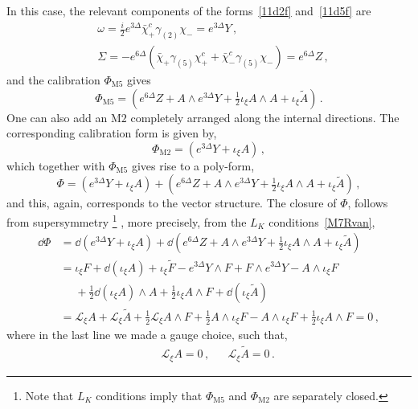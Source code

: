 \documentclass[debug]{phd}
\begin{document}
In this case, the relevant components of the forms~\eqref{11d2f} and~\eqref{11d5f} are 
%
	\begin{equation*}
		\begin{aligned}
			& \omega = \tfrac{i}{2} e^{3\Delta} \bar{\chi}_{+}^c \gamma_{(2)} \chi_{-} = e^{3\Delta} Y \, ,\\[1mm]
			& \Sigma = -e^{6\Delta}(\bar{\chi}_+ \gamma_{(5)} \chi_+^c + \bar{\chi}_-^c \gamma_{(5)} \chi_- ) = e^{6\Delta} Z\, ,
		\end{aligned}
	\end{equation*}
%
and the calibration $\Phi_{\mathrm{M}5}$ gives
%
	\begin{equation}
		\Phi_{\mathrm{M}5} = (e^{6\Delta} Z + A \wedge e^{3\Delta} Y + \tfrac{1}{2}\iota_\xi A \wedge A + \iota_{\xi}\tilde{A})\, .
	\end{equation}	
%
One can also add an $\mathrm{M}2$ completely arranged along the internal directions. 
The corresponding calibration form is given by,
%
	\begin{equation}
		\Phi_{\mathrm{M}2} = (e^{3\Delta} Y + \iota_{\xi} A )\, ,
	\end{equation}
%
which together with $\Phi_{\mathrm{M}5}$ gives rise to a poly-form,
%
	\begin{equation}
		\Phi = (e^{3\Delta} Y + \iota_{\xi} A ) + (e^{6\Delta} Z + A \wedge e^{3\Delta} Y + \tfrac{1}{2}\iota_\xi A \wedge A + \iota_{\xi}\tilde{A})\, ,
	\end{equation}
%
and this, again, corresponds to the vector structure. 
The closure of $\Phi$, follows from supersymmetry%
		\footnote{%
			Note that $L_K$ conditions imply that $\Phi_{\mathrm{M}5}$ and $\Phi_{\mathrm{M}2}$ are separately closed.%
			}%
			, more precisely, from the $L_K$ conditions~\eqref{M7Rvan},
%
		\begin{equation}
			\begin{split}
				\dd  \Phi &= \dd  (e^{3\Delta} Y + \iota_{\xi} A ) + \dd  (e^{6\Delta} Z + A \wedge e^{3\Delta} Y + \tfrac{1}{2}\iota_\xi A \wedge A + \iota_{\xi}\tilde{A}) \\[1mm]
						& = \iota_\xi F + \dd  (\iota_\xi A) + \iota_\xi \tilde{F} - e^{3\Delta} Y \wedge F + F \wedge e^{3\Delta} Y - A \wedge \iota_\xi F \\
						& \phantom{=} + \tfrac{1}{2} \dd  (\iota_\xi A) \wedge A + \tfrac{1}{2} \iota_\xi A \wedge F + \dd  (\iota_\xi \tilde{A}) \\[1mm]
						&= \mathcal{L}_\xi A + \mathcal{L}_\xi \tilde{A} + \tfrac{1}{2} \mathcal{L}_\xi A \wedge F + \tfrac{1}{2} A \wedge \iota_\xi F - A \wedge \iota_\xi F + \tfrac{1}{2}\iota_\xi A \wedge F = 0\, ,
			\end{split}	
		\end{equation}
%
where in the last line we made a gauge choice, such that,
%
	\begin{align}
		& & & \mathcal{L}_\xi A= 0\, , & & \mathcal{L}_\xi \tilde{A}= 0\, . & 
	\end{align}
%
%
	
\end{document}
